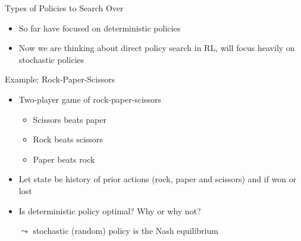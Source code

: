\documentclass[aspectratio=169]{../latex_main/tntbeamer}  %
\begin{document}
\begin{frame}[c]{Types of Policies to Search Over}
	
\begin{itemize}
	\item So far have focused on deterministic policies
	\item Now we are thinking about direct policy search in RL, will focus
	heavily on stochastic policies
\end{itemize}

\end{frame}
\begin{frame}[c]{Example: Rock-Paper-Scissors}
	
	\begin{itemize}
		\item Two-player game of rock-paper-scissors
		\begin{itemize}
			\item Scissors beats paper
			\item Rock beats scissors
			\item Paper beats rock
		\end{itemize}
		\item Let state be history of prior actions (rock, paper and scissors) and if
		won or lost
		\item Is deterministic policy optimal? Why or why not?
		\pause
		\item[$\leadsto$] stochastic (random) policy is the Nash equilibrium
	\end{itemize}

	
\end{frame}
\end{document}

